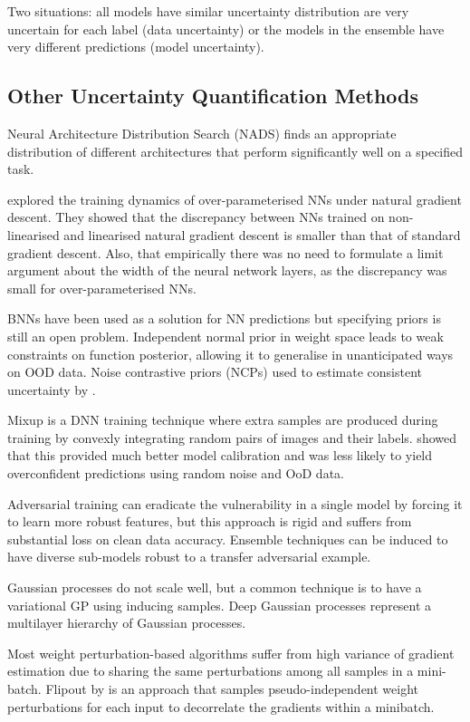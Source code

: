 \documentclass[twoside,11pt]{article}
\begin{document}
Two situations: all models have similar uncertainty distribution are very uncertain for each label (data uncertainty) or the models in the ensemble have very different predictions (model uncertainty).

\subsection{Other Uncertainty Quantification Methods}
Neural Architecture Distribution Search (NADS) finds an appropriate distribution of different architectures that perform significantly well on a specified task.

explored the training dynamics of over-parameterised NNs under natural gradient descent.
They showed that the discrepancy between NNs trained on non-linearised and linearised natural gradient descent is smaller than that of standard gradient descent.
Also, that empirically there was no need to formulate a limit argument about the width of the neural network layers, as the discrepancy was small for over-parameterised NNs.

BNNs have been used as a solution for NN predictions but specifying priors is still an open problem.
Independent normal prior in weight space leads to weak constraints on function posterior, allowing it to generalise in unanticipated ways on OOD data.
Noise contrastive priors (NCPs) used to estimate consistent uncertainty by \cite{hafner2020noise}.

Mixup is a DNN training technique where extra samples are produced during training by convexly integrating random pairs of images and their labels.
\cite{thulasidasan2019mixup} showed that this provided much better model calibration and was less likely to yield overconfident predictions using random noise and OoD data.

Adversarial training can eradicate the vulnerability in a single model by forcing it to learn more robust features, but this approach is rigid and suffers from substantial loss on clean data accuracy.
Ensemble techniques can be induced to have diverse sub-models robust to a transfer adversarial example.

Gaussian processes do not scale well, but a common technique is to have a variational GP using inducing samples.
Deep Gaussian processes represent a multilayer hierarchy of Gaussian processes.

Most weight perturbation-based algorithms suffer from high variance of gradient estimation due to sharing the same perturbations among all samples in a mini-batch.
Flipout by \cite{wen2018flipout} is an approach that samples pseudo-independent weight perturbations for each input to decorrelate the gradients within a minibatch.
\end{document}
